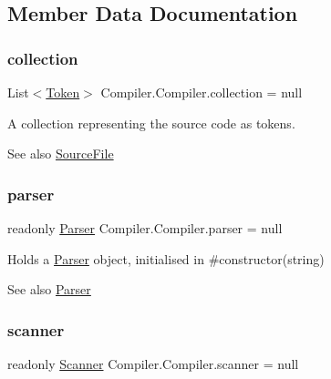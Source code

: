 \subsection{Member Data Documentation}
\mbox{\label{class_compiler_1_1_compiler_a8279f3629691412ae917e1760437d670}} 
\subsubsection{\texorpdfstring{collection}{collection}}
{\footnotesize\ttfamily List$<$\mbox{\hyperlink{class_compiler_1_1_token}{Token}}$>$ Compiler.\+Compiler.\+collection = null\hspace{0.3cm}{\ttfamily [private]}}

A collection representing the source code as tokens. \begin{DoxySeeAlso}{See also}
\mbox{\hyperlink{class_compiler_1_1_source_file}{Source\+File}} 
\end{DoxySeeAlso}
\mbox{\label{class_compiler_1_1_compiler_a73660c59052687e1b4b92b7549dcd171}} 
\subsubsection{\texorpdfstring{parser}{parser}}
{\footnotesize\ttfamily readonly \mbox{\hyperlink{class_compiler_1_1_parser}{Parser}} Compiler.\+Compiler.\+parser = null\hspace{0.3cm}{\ttfamily [private]}}

Holds a \mbox{\hyperlink{class_compiler_1_1_parser}{Parser}} object, initialised in \#constructor(string) \begin{DoxySeeAlso}{See also}
\mbox{\hyperlink{class_compiler_1_1_parser}{Parser}} 
\end{DoxySeeAlso}
\mbox{\label{class_compiler_1_1_compiler_a8ec56dd708f82bf4b16a074f7263e8f1}} 
\subsubsection{\texorpdfstring{scanner}{scanner}}
{\footnotesize\ttfamily readonly \mbox{\hyperlink{class_compiler_1_1_scanner}{Scanner}} Compiler.\+Compiler.\+scanner = null\hspace{0.3cm}{\ttfamily [private]}}

